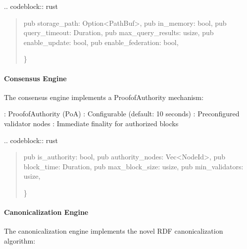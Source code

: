 \documentclass[letterpaper,10pt,english]{sphinxmanual}
\begin{document}
\sphinxAtStartPar
{}
.. code\sphinxhyphen{}block:: rust
\begin{quote}
\begin{description}
\sphinxAtStartPar
pub storage\_path: Option\textless{}PathBuf\textgreater{},
pub in\_memory: bool,
pub query\_timeout: Duration,
pub max\_query\_results: usize,
pub enable\_update: bool,
pub enable\_federation: bool,

\end{description}

\sphinxAtStartPar
\}
\end{quote}


\paragraph{Consensus Engine}
\label{\detokenize{research/technical-specifications:consensus-engine}}
\sphinxAtStartPar
The consensus engine implements a Proof\sphinxhyphen{}of\sphinxhyphen{}Authority mechanism:

\sphinxAtStartPar
{}
\sphinxhyphen{} : Proof\sphinxhyphen{}of\sphinxhyphen{}Authority (PoA)
\sphinxhyphen{} : Configurable (default: 10 seconds)
\sphinxhyphen{} : Pre\sphinxhyphen{}configured validator nodes
\sphinxhyphen{} : Immediate finality for authorized blocks

\sphinxAtStartPar
{}
.. code\sphinxhyphen{}block:: rust
\begin{quote}
\begin{description}
\sphinxAtStartPar
pub is\_authority: bool,
pub authority\_nodes: Vec\textless{}NodeId\textgreater{},
pub block\_time: Duration,
pub max\_block\_size: usize,
pub min\_validators: usize,

\end{description}

\sphinxAtStartPar
\}
\end{quote}


\paragraph{Canonicalization Engine}
\label{\detokenize{research/technical-specifications:canonicalization-engine}}
\sphinxAtStartPar
The canonicalization engine implements the novel RDF canonicalization algorithm:
\end{document}
